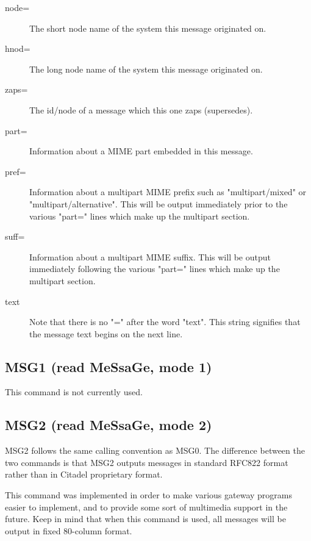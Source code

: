 \begin{description}
\item[node=]
    The short node name of the system this message originated on.

\item[hnod=]
    The long node name of the system this message originated on.

\item[zaps=]
    The id/node of a message which this one zaps (supersedes).

\item[part=]
    Information about a MIME part embedded in this message.

\item[pref=]
    Information about a multipart MIME prefix such as "multipart/mixed" or
    "multipart/alternative".  This will be output immediately prior to the
    various "part=" lines which make up the multipart section.

\item[suff=]
    Information about a multipart MIME suffix.  This will be output immediately
    following the various "part=" lines which make up the multipart section.

\item[text]
    Note that there is no "=" after the word "text".  This string signifies that
    the message text begins on the next line.

\end{description}



\subsection{MSG1 (read MeSsaGe, mode 1)}

 This command is not currently used.



\subsection{MSG2 (read MeSsaGe, mode 2)}

 MSG2 follows the same calling convention as MSG0.  The difference between
the two commands is that MSG2 outputs messages in standard RFC822 format
rather than in Citadel proprietary format.

 This command was implemented in order to make various gateway programs
easier to implement, and to provide some sort of multimedia support in the
future.  Keep in mind that when this command is used, all messages will be
output in fixed 80-column format.



